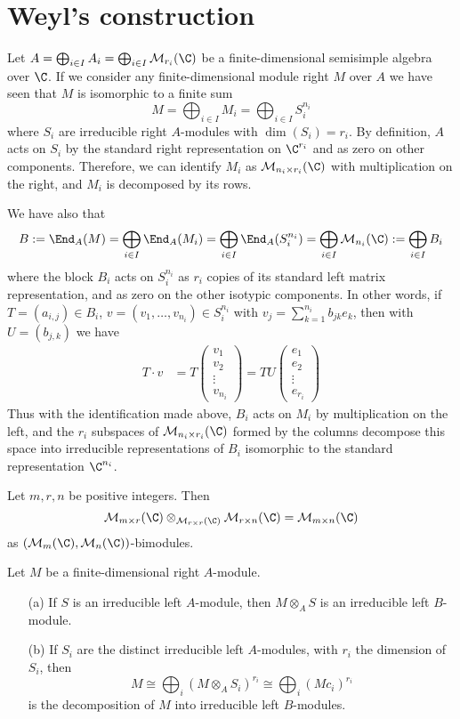 \section{Weyl's construction}
Let $A=\bigoplus_{i\in I}A_i=\bigoplus_{i\in I}\mathcal{M}_{r_i}(\C)$ be a finite-dimensional semisimple algebra over $\C$. If we consider any finite-dimensional module right $M$ over $A$ we have seen that $M$ is isomorphic to a finite sum
\[M=\bigoplus_{i\in I}M_i=\bigoplus_{i\in I}S_i^{n_i}\]
where $S_i$ are irreducible right $A$-modules with $\dim(S_i)=r_i$. By definition, $A$ acts on $S_i$ by the standard right representation on $\C^{r_i}$ and as zero on other components. Therefore, we can identify $M_i$ as $\mathcal{M}_{n_i\times r_i}(\C)$ with multiplication on the right, and $M_i$ is decomposed by its rows.\par
We have also that
\[B:=\End_A(M)=\bigoplus_{i\in I}\End_A(M_i)=\bigoplus_{i\in I}\End_A(S_i^{n_i})=\bigoplus_{i\in I}\mathcal{M}_{n_i}(\C):=\bigoplus_{i\in I}B_i\]
where the block $B_i$ acts on $S_i^{n_i}$ as $r_i$ copies of its standard left matrix representation, and as zero on the other isotypic components. In other words, if $T=(a_{i,j})\in B_i$, $v=(v_1,\dots,v_{n_i})\in S_i^{n_i}$ with $v_j=\sum_{k=1}^{n_i}b_{jk}e_k$, then with $U=(b_{j,k})$ we have
\begin{align*}
T\cdot v&=T\begin{pmatrix}
v_1\\
v_2\\
\vdots\\
v_{n_i}
\end{pmatrix}=TU\begin{pmatrix}
e_1\\
e_2\\
\vdots\\
e_{r_i}
\end{pmatrix}
\end{align*}
Thus with the identification made above, $B_i$ acts on $M_i$ by multiplication on the left, and the $r_i$ subspaces of $\mathcal{M}_{n_i\times r_i}(\C)$ formed by the columns decompose this space into irreducible representations of $B_i$ isomorphic to the standard representation $\C^{n_i}$.
\begin{lemma}
Let $m,r,n$ be positive integers. Then
\[\mathcal{M}_{m\times r}(\C)\otimes_{\mathcal{M}_{r\times r}(\C)}\mathcal{M}_{r\times n}(\C)=\mathcal{M}_{m\times n}(\C)\]
as $(\mathcal{M}_{m}(\C),\mathcal{M}_{n}(\C))$-bimodules.
\end{lemma}
\begin{proposition}
Let $M$ be a finite-dimensional right $A$-module.
\begin{itemize}
\item[(a)] If $S$ is an irreducible left $A$-module, then $M\otimes_AS$ is an irreducible left $B$-module.
\item[(b)] If $S_i$ are the distinct irreducible left $A$-modules, with $r_i$ the dimension of $S_i$, then
\[M\cong\bigoplus_i(M\otimes_AS_i)^{r_i}\cong\bigoplus_i(Mc_i)^{r_i}\]
is the decomposition of $M$ into irreducible left $B$-modules.
\end{itemize}
\end{proposition}
